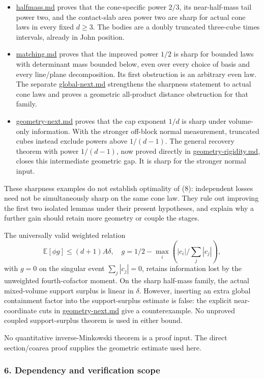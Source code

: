 \documentclass[
  11pt,
]{article}
\providecommand{\tightlist}{%
  \setlength{\itemsep}{0pt}\setlength{\parskip}{0pt}}
\begin{document}
\begin{itemize}
\tightlist
\item
  \url{halfmass.md} proves that the cone-specific power \(2/3\), its
  near-half-mass tail power two, and the contact-slab area power two are
  sharp for actual cone laws in every fixed \(d\ge3\). The bodies are a
  doubly truncated three-cube times intervals, already in John position.
\item
  \url{matching.md} proves that the improved power \(1/2\) is sharp for
  bounded laws with determinant mass bounded below, even over every
  choice of basis and every line/plane decomposition. Its first
  obstruction is an arbitrary even law. The separate
  \url{global-next.md} strengthens the sharpness statement to actual
  cone laws and proves a geometric all-product distance obstruction for
  that family.
\item
  \url{geometry-next.md} proves that the cap exponent \(1/d\) is sharp
  under volume-only information. With the stronger off-block normal
  measurement, truncated cubes instead exclude powers above \(1/(d-1)\).
  The general recovery theorem with power \(1/(d-1)\), now proved
  directly in \url{geometry-rigidity.md}, closes this intermediate
  geometric gap. It is sharp for the stronger normal input.
\end{itemize}

These sharpness examples do not establish optimality of (8): independent
losses need not be simultaneously sharp on the same cone law. They rule
out improving the first two isolated lemmas under their present
hypotheses, and explain why a further gain should retain more geometry
or couple the stages.

The universally valid weighted relation \[
\mathbb E[\phi g]\le(d+1)A\delta,
\quad g=1/2-\max_i(|c_i|/\sum_j|c_j|),
\] with \(g=0\) on the singular event \(\sum_j|c_j|=0\), retains
information lost by the unweighted fourth-cofactor moment. On the sharp
half-mass family, the actual mixed-volume support surplus is linear in
\(\delta\). However, inserting an extra global containment factor into
the support-surplus estimate is false: the explicit near-coordinate cuts
in \url{geometry-next.md} give a counterexample. No unproved coupled
support-surplus theorem is used in either bound.

No quantitative inverse-Minkowski theorem is a proof input. The direct
section/coarea proof supplies the geometric estimate used here.

\subsubsection{6. Dependency and verification
scope}\label{dependency-and-verification-scope}
\end{document}
